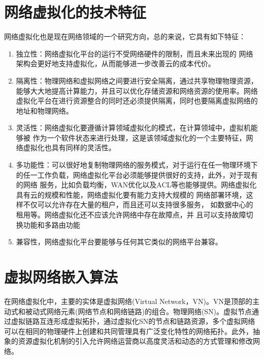 



\section{网络虚拟化的技术特征}
网络虚拟化也是现在网络领域的一个研究方向，总的来说，它具有如下特征\cite{chowdhury2010survey}：
\begin{enumerate}
  \item 独立性：网络虚拟化平台的运行不受网络硬件的限制，而且未来出现的 网络架构会更好地支持虚拟化，从而能够进一步改善云的成本代价。
  \item 隔离性：物理网络和虚拟网络之间要进行安全隔离，通过共享物理物理资源，能够大大地提高计算能力，并且可以优化存储资源和网络资源的使用率。网络虚拟化平台在进行资源整合的同时还必须提供隔离，同时也要隔离虚拟网络的地址和物理网络。
  \item  灵活性：网络虚拟化要遵循计算领域虚拟化的模式，在计算领域中，虚拟机能够被 作为一个软件状态来进行处理，这是该领域虚拟化的一个主要特征，网络虚拟化也具有同样的灵活性。
  \item 多功能性：可以很好地复制物理网络的服务模式，对于运行在任一物理环境下的任一工作负载，网络虚拟化平台必须能够提供很好的支持，此外，对于现有的网络 服务，比如负载均衡，WAN优化以及ACL等也能够提供。网络虚拟化具有云的规模和性能，网络虚拟化要有能力支持大规模的 网络部署环境，这样不仅可以允许存在大量的租户，而且还可以支持很多服务， 如数据中心的租用等。网络虚拟化还不应该允许网络中存在故障点，并 且可以支持故障切换功能和多路由功能
  \item 兼容性，网络虚拟化平台要能够与任何其它类似的网络平台兼容。
\end{enumerate}


\section{虚拟网络嵌入算法}
在网络虚拟化中，主要的实体是虚拟网络(Virtual Network，VN)。VN是顶部的主动式和被动式网络元素(网络节点和网络链路)的组合。物理网络(SN)。虚拟节点通过虚拟链路互连形成虚拟拓扑，通过虚拟化SN的节点和链路资源，多个虚拟网络可以在相同的物理硬件上创建和共同管理具有广泛变化特性的网络拓扑。此外，抽象的资源虚拟化机制的引入允许网络运营商以高度灵活和动态的方式管理和修改网络。

